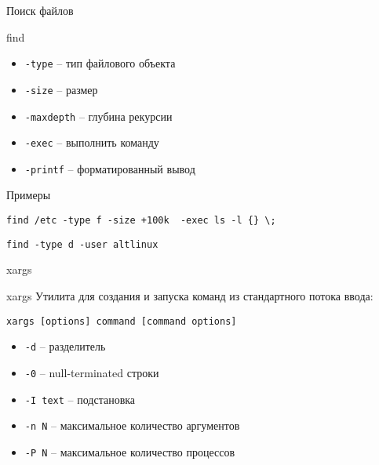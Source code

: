 \begin{frame}[fragile]{Поиск файлов}
	\begin{block}{find}
		\begin{itemize}
			\item {\tt -type} -- тип файлового объекта
			\item {\tt -size} -- размер
			\item {\tt -maxdepth} -- глубина рекурсии
			\item {\tt -exec} -- выполнить команду
			\item {\tt -printf} -- форматированный вывод
		\end{itemize}
	\end{block}

	\begin{block}{Примеры}
		\begin{verbatim}
find /etc -type f -size +100k  -exec ls -l {} \;
		\end{verbatim}

		\begin{verbatim}
find -type d -user altlinux
		\end{verbatim}
	
	\end{block}
\end{frame}

\begin{frame}[fragile]{xargs}
	\begin{block}{xargs}
			Утилита для создания и запуска команд из стандартного потока ввода:
		\begin{verbatim}
xargs [options] command [command options]
		\end{verbatim}

		\begin{itemize}
			\item {\tt -d} -- разделитель
			\item {\tt -0} -- null-terminated строки
			\item {\tt -I text} -- подстановка
			\item {\tt -n N} -- максимальное количество аргументов
			\item {\tt -P N} -- максимальное количество процессов
		\end{itemize}

	\end{block}
\end{frame}

